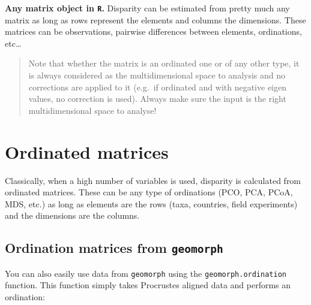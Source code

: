 \documentclass[]{book}
\newenvironment{Shaded}{\begin{snugshade}}{\end{snugshade}}
\newcommand{\KeywordTok}[1]{\textcolor[rgb]{0.13,0.29,0.53}{\textbf{#1}}}
\newcommand{\DataTypeTok}[1]{\textcolor[rgb]{0.13,0.29,0.53}{#1}}
\newcommand{\DecValTok}[1]{\textcolor[rgb]{0.00,0.00,0.81}{#1}}
\newcommand{\StringTok}[1]{\textcolor[rgb]{0.31,0.60,0.02}{#1}}
\newcommand{\OtherTok}[1]{\textcolor[rgb]{0.56,0.35,0.01}{#1}}
\newcommand{\OperatorTok}[1]{\textcolor[rgb]{0.81,0.36,0.00}{\textbf{#1}}}
\newcommand{\NormalTok}[1]{#1}
\theoremstyle{definition}
\theoremstyle{definition}
\theoremstyle{remark}
\begin{document}
\textbf{Any matrix object in \texttt{R}.} Disparity can be estimated
from pretty much any matrix as long as rows represent the elements and
columns the dimensions. These matrices can be observations, pairwise
differences between elements, ordinations, etc\ldots{}

\begin{quote}
Note that whether the matrix is an ordinated one or of any other type,
it is always considered as the multidimensional space to analysis and no
corrections are applied to it (e.g.~if ordinated and with negative eigen
values, no correction is used). Always make sure the input is the right
multidimensional space to analyse!
\end{quote}

\section{Ordinated matrices}\label{ordinated-matrices}

Classically, when a high number of variables is used, disparity is
calculated from ordinated matrices. These can be any type of ordinations
(PCO, PCA, PCoA, MDS, etc.) as long as elements are the rows (taxa,
countries, field experiments) and the dimensions are the columns.

\subsection{\texorpdfstring{Ordination matrices from
\texttt{geomorph}}{Ordination matrices from geomorph}}\label{ordination-matrices-from-geomorph}

You can also easily use data from \texttt{geomorph} using the
\texttt{geomorph.ordination} function. This function simply takes
Procrustes aligned data and performs an ordination:

\begin{Shaded}
\end{Shaded}
\end{document}

